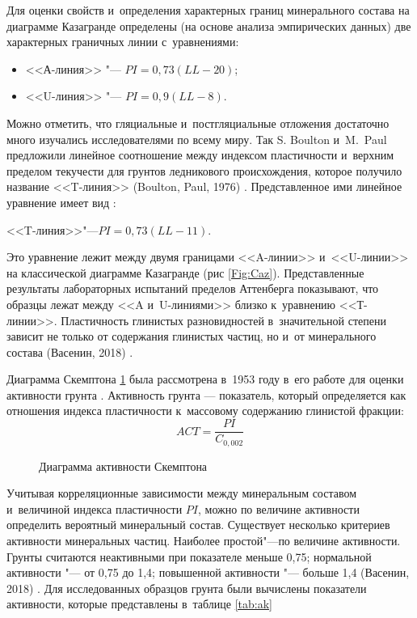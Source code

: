 Для оценки свойств и~определения характерных границ минерального состава на диаграмме Казагранде определены (на основе анализа эмпирических данных) две характерных граничных линии с~уравнениями:

\begin{itemize}
    \item <<А-линия>> "--- $PI = 0,73(LL - 20)$;
    \item <<U-линия>> "--- $PI = 0,9(LL - 8)$.
\end{itemize}

Можно отметить, что гляциальные и~постгляциальные отложения достаточно много изучались исследователями по всему миру. Так S. Boulton и~M.~Paul  предложили линейное соотношение между  индексом пластичности и~верхним пределом текучести  для грунтов ледникового происхождения, которое получило название <<T-линия>> (Boulton, Paul, 1976) \cite{boulton1976}. Представленное ими линейное уравнение имеет вид :

<<T-линия>>"---$PI = 0,73(LL-11)$.

Это уравнение лежит между двумя границами <<A-линии>> и~<<U-линии>> на классической диаграмме Казагранде (рис \ref{Fig:Caz}). Представленные результаты лабораторных испытаний пределов Аттенберга показывают, что образцы лежат между <<A и~U-линиями>> близко к~уравнению <<Т-линии>>. Пластичность глинистых разновидностей в~значительной степени зависит не только от содержания глинистых частиц, но и~от минерального состава (Васенин, 2018) \cite{vasenin2018}.

Диаграмма Скемптона \ref{Fig:Skt} была рассмотрена в~1953 году в~его работе для оценки активности грунта \cite{skempton1953}.
Активность грунта — показатель, который определяется как отношения индекса пластичности к~массовому содержанию глинистой фракции:
$$ ACT = \frac{PI}{C_{0,002}}$$

\begin{figure}[ht]
    \centering
    \small
    
    \caption{Диаграмма активности Скемптона}
    \label{Fig:Skt}
  \end{figure}

Учитывая корреляционные зависимости между минеральным составом и~величиной индекса пластичности $PI$, можно по величине активности определить вероятный минеральный состав. Существует несколько критериев активности минеральных частиц. Наиболее простой"---по величине активности. 
Грунты считаются неактивными при показателе меньше 0,75; нормальной активности "--- от 0,75 до 1,4; повышенной активности "--- больше 1,4 (Васенин, 2018) \cite{vasenin2018}.
Для исследованных образцов грунта были вычислены показатели активности, которые представлены в~таблице \ref{tab:ak}


